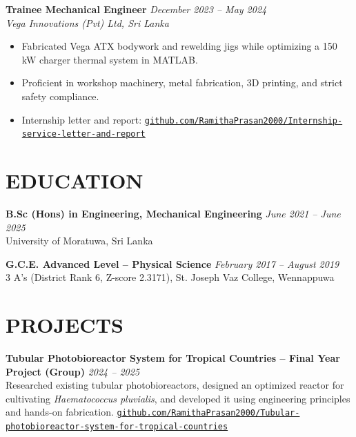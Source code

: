 \documentclass[10pt,a4paper]{article}
\newcommand{\role}[3]{%
    \textbf{#1} \hfill {\itshape\color{dategray}#2}\\
    \textit{#3}\\[-2pt]
}
\newcommand{\entry}[2]{%
    \textbf{#1} \hfill {\itshape\color{dategray}#2}\\[2pt]
}
\begin{document}
\role{Trainee Mechanical Engineer}{December 2023 -- May 2024}{Vega Innovations (Pvt) Ltd, Sri Lanka}
\vspace{-10pt}
\begin{itemize}[leftmargin=18pt, itemsep=3pt, topsep=0pt, partopsep=0pt, parsep=0pt]
    \item Fabricated Vega ATX bodywork and rewelding jigs while optimizing a 150 kW charger thermal system in MATLAB.
    \item Proficient in workshop machinery, metal fabrication, 3D printing, and strict safety compliance.
    \item Internship letter and report: \href{https://github.com/RamithaPrasan2000/Internship-service-letter-and-report.git}{\nolinkurl{github.com/RamithaPrasan2000/Internship-service-letter-and-report}}
\end{itemize}
\vspace{7pt}

\section{EDUCATION}

\entry{B.Sc (Hons) in Engineering, Mechanical Engineering}{June 2021 -- June 2025}
\hspace*{1.5em}University of Moratuwa, Sri Lanka

\entry{G.C.E. Advanced Level -- Physical Science}{February 2017 -- August 2019}
\hspace*{1.5em}3 A's (District Rank 6, Z-score 2.3171), St. Joseph Vaz College, Wennappuwa

\section{PROJECTS}

\entry{Tubular Photobioreactor System for Tropical Countries -- Final Year Project (Group)}{2024 -- 2025}
\hspace*{1.5em}Researched existing tubular photobioreactors, designed an optimized reactor for cultivating \textit{Haematococcus pluvialis}, and developed it using engineering principles and hands-on fabrication. \newline
\hspace*{1.5em}\href{https://github.com/RamithaPrasan2000/Tubular-photobioreactor-system-for-tropical-countries.git}{\nolinkurl{github.com/RamithaPrasan2000/Tubular-photobioreactor-system-for-tropical-countries}}
\end{document}
